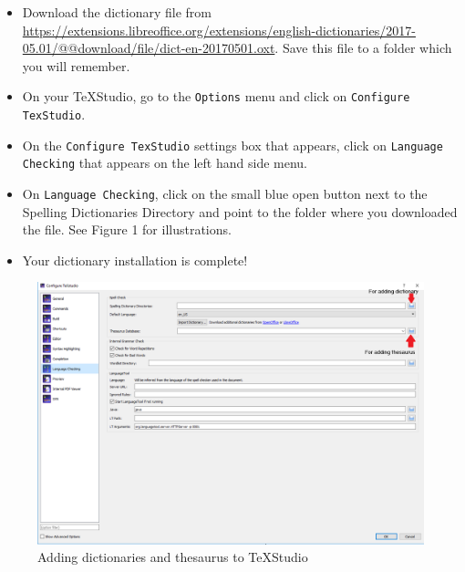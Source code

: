 \documentclass[]{article}
\begin{document}
\begin{itemize}
	\item Download the dictionary file from \url{https://extensions.libreoffice.org/extensions/english-dictionaries/2017-05.01/@@download/file/dict-en-20170501.oxt}. Save this file to a folder which you will remember.
	\item On your TeXStudio, go to the \texttt{Options} menu and click on \texttt{Configure TexStudio}.
	\item On the \texttt{Configure TexStudio} settings box that appears, click on \texttt{Language Checking} that appears on the left hand side menu. 
	\item On \texttt{Language Checking}, click on the small blue open button next to the Spelling Dictionaries Directory and point to the folder where you downloaded the file. See Figure 1 for illustrations.
	\item Your dictionary installation is complete!
\end{itemize}

\begin{figure}[H]
	\centering
	\includegraphics[scale = 0.5]{img/languagetool}
	\caption{Adding dictionaries and thesaurus to TeXStudio}
\end{figure}
\end{document}
